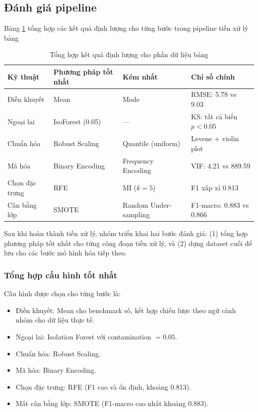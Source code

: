 \subsection{Đánh giá pipeline}
Bảng \ref{tab:tabular_pipeline_summary} tổng hợp các kết quả định lượng cho từng bước trong pipeline tiền xử lý bảng
\begin{table}[H]
    \centering
    \begin{tabular}{|l|l|l|l|}
        \hline
        \textbf{Kỹ thuật} & \textbf{Phương pháp tốt nhất} & \textbf{Kém nhất}     & \textbf{Chỉ số chính}    \\
        \hline
        Điền khuyết       & Mean                          & Mode                  & RMSE: 5.78 vs 9.03       \\
        \hline
        Ngoại lai         & IsoForest (0.05)              & ---                   & KS: tất cả biến $p<0.05$ \\
        \hline
        Chuẩn hóa         & Robust Scaling                & Quantile (uniform)    & Levene + violin plot     \\
        \hline
        Mã hóa            & Binary Encoding               & Frequency Encoding    & VIF: 4.21 vs 889.59      \\
        \hline
        Chọn đặc trưng    & RFE                           & MI ($k=5$)            & F1 xấp xỉ 0.813          \\
        \hline
        Cân bằng lớp      & SMOTE                         & Random Under-sampling & F1-macro: 0.883 vs 0.866 \\
        \hline
    \end{tabular}
    \caption{Tổng hợp kết quả định lượng cho phần dữ liệu bảng}
    \label{tab:tabular_pipeline_summary}
\end{table}

Sau khi hoàn thành tiền xử lý, nhóm triển khai hai bước đánh giá: (1) tổng hợp phương pháp tốt nhất cho từng công đoạn tiền xử lý, và (2) dựng dataset cuối để lưu cho các bước mô hình hóa tiếp theo.

\subsubsection{Tổng hợp cấu hình tốt nhất}
Cấu hình được chọn cho từng bước là:
\begin{itemize}
    \item Điền khuyết: Mean cho benchmark số, kết hợp chiến lược theo ngữ cảnh nhóm cho dữ liệu thực tế.
    \item Ngoại lai: Isolation Forest với contamination $=0.05$.
    \item Chuẩn hóa: Robust Scaling.
    \item Mã hóa: Binary Encoding.
    \item Chọn đặc trưng: RFE (F1 cao và ổn định, khoảng 0.813).
    \item Mất cân bằng lớp: SMOTE (F1-macro cao nhất khoảng 0.883).
\end{itemize}

